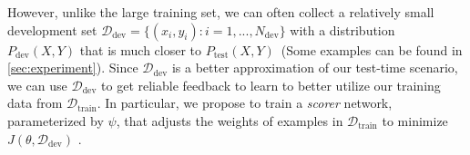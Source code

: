 However, unlike the large training set, we can often collect a relatively small development set $\mathcal{D}_\text{dev}= \{(x_i, y_i): i = 1, ..., N_\text{dev}\}$ with a distribution $P_{\text{dev}}(X, Y)$ that is much closer to $P_{\text{test}}(X, Y)$~(Some examples can be found in \autoref{sec:experiment}).
Since $\mathcal{D}_\text{dev}$ is a better approximation of our test-time scenario,
we can use $\mathcal{D}_\text{dev}$ to get reliable feedback to learn to better utilize our training data from $\mathcal{D}_\text{train}$. In particular, we propose to train a \emph{scorer} network, parameterized by $\psi$, that adjusts the weights of examples in $\mathcal{D}_\text{train}$ to minimize $J(\theta, \mathcal{D}_\text{dev})$ .



